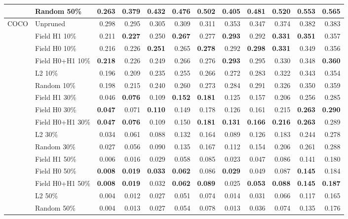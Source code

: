 \begin{tabular}{llrrrrrrrrrr}
 & Random 50\% & 0.263 & 0.379 & 0.432 & 0.476 & 0.502 & 0.405 & 0.481 & 0.520 & 0.553 & 0.565 \\
\midrule
COCO & Unpruned & 0.298 & 0.295 & 0.305 & 0.309 & 0.311 & 0.353 & 0.347 & 0.374 & 0.382 & 0.383 \\
 & Field H1 10\% & 0.211 & \textbf{0.227} & 0.250 & \textbf{0.267} & 0.277 & \textbf{0.293} & 0.292 & \textbf{0.331} & \textbf{0.351} & 0.357 \\
 & Field H0 10\% & 0.216 & 0.226 & \textbf{0.251} & 0.265 & \textbf{0.278} & 0.292 & \textbf{0.298} & \textbf{0.331} & 0.349 & 0.356 \\
 & Field H0+H1 10\% & \textbf{0.218} & 0.226 & 0.249 & 0.266 & 0.276 & \textbf{0.293} & 0.295 & 0.330 & 0.348 & \textbf{0.360} \\
 & L2 10\% & 0.196 & 0.209 & 0.235 & 0.255 & 0.266 & 0.272 & 0.283 & 0.322 & 0.343 & 0.354 \\
 & Random 10\% & 0.198 & 0.215 & 0.240 & 0.260 & 0.273 & 0.284 & 0.291 & 0.326 & 0.350 & 0.359 \\
\addlinespace[2pt]
 & Field H1 30\% & 0.046 & \textbf{0.076} & 0.109 & \textbf{0.152} & \textbf{0.181} & 0.125 & 0.157 & 0.206 & 0.256 & 0.285 \\
 & Field H0 30\% & \textbf{0.047} & 0.071 & \textbf{0.110} & 0.149 & 0.178 & 0.126 & 0.161 & 0.215 & \textbf{0.263} & \textbf{0.290} \\
 & Field H0+H1 30\% & \textbf{0.047} & \textbf{0.076} & 0.109 & 0.150 & \textbf{0.181} & \textbf{0.131} & \textbf{0.166} & \textbf{0.216} & \textbf{0.263} & 0.289 \\
 & L2 30\% & 0.034 & 0.061 & 0.088 & 0.132 & 0.164 & 0.089 & 0.126 & 0.183 & 0.244 & 0.278 \\
 & Random 30\% & 0.027 & 0.056 & 0.090 & 0.135 & 0.167 & 0.112 & 0.154 & 0.206 & 0.261 & 0.288 \\
\addlinespace[2pt]
 & Field H1 50\% & 0.006 & 0.016 & 0.029 & 0.058 & 0.085 & 0.023 & 0.047 & 0.086 & 0.141 & 0.180 \\
 & Field H0 50\% & \textbf{0.008} & \textbf{0.019} & \textbf{0.033} & \textbf{0.062} & 0.086 & \textbf{0.029} & 0.049 & 0.087 & \textbf{0.145} & 0.184 \\
 & Field H0+H1 50\% & \textbf{0.008} & \textbf{0.019} & 0.032 & \textbf{0.062} & \textbf{0.089} & 0.025 & \textbf{0.053} & \textbf{0.088} & \textbf{0.145} & \textbf{0.187} \\
 & L2 50\% & 0.004 & 0.012 & 0.027 & 0.051 & 0.074 & 0.014 & 0.031 & 0.066 & 0.117 & 0.165 \\
 & Random 50\% & 0.004 & 0.013 & 0.027 & 0.054 & 0.078 & 0.013 & 0.036 & 0.074 & 0.135 & 0.176 \\
\bottomrule
\end{tabular}
